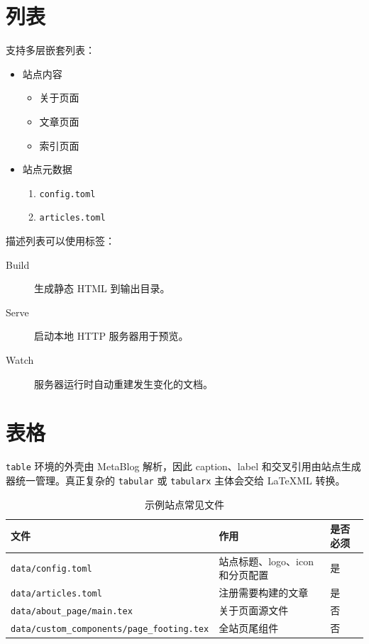 \section{列表}

支持多层嵌套列表：

\begin{itemize}
  \item 站点内容
  \begin{itemize}
    \item 关于页面
    \item 文章页面
    \item 索引页面
  \end{itemize}
  \item 站点元数据
  \begin{enumerate}
    \item \texttt{config.toml}
    \item \texttt{articles.toml}
  \end{enumerate}
\end{itemize}

描述列表可以使用标签：

\begin{description}
  \item[Build] 生成静态 HTML 到输出目录。
  \item[Serve] 启动本地 HTTP 服务器用于预览。
  \item[Watch] 服务器运行时自动重建发生变化的文档。
\end{description}

\section{表格}

\texttt{table} 环境的外壳由 MetaBlog 解析，因此 caption、label 和交叉引用由站点生成器统一管理。真正复杂的 \texttt{tabular} 或 \texttt{tabularx} 主体会交给 LaTeXML 转换。

\begin{table}
\caption{\centering 示例站点常见文件}
\label{tab:example-files}
\begin{tabular}{lll}
\hline
文件 & 作用 & 是否必须 \\
\hline
\texttt{data/config.toml} & 站点标题、logo、icon 和分页配置 & 是 \\
\texttt{data/articles.toml} & 注册需要构建的文章 & 是 \\
\texttt{data/about_page/main.tex} & 关于页面源文件 & 否 \\
\texttt{data/custom_components/page_footing.tex} & 全站页尾组件 & 否 \\
\hline
\end{tabular}
\end{table}

